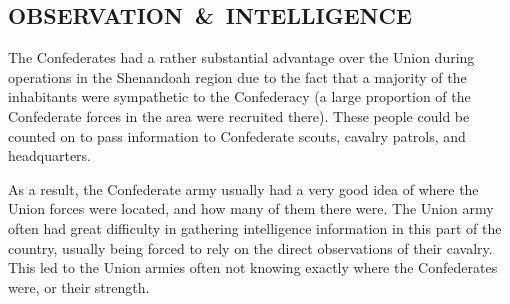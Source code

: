 \subsection[OBSERVATION \& INTELLIGENCE]{\mbox{OBSERVATION \& INTELLIGENCE}}

The Confederates had a rather substantial advantage over the Union during operations in the Shenandoah region due to the fact that a majority of the inhabitants were sympathetic to the Confederacy (a large proportion of the Confederate forces in the area were recruited there). These people could be counted on to pass information to Confederate scouts, cavalry patrols, and headquarters.

As a result, the Confederate army usually had a very good idea of where the Union forces were located, and how many of them there were. The Union army often had great difficulty in gathering intelligence information in this part of the country, usually being forced to rely on the direct observations of their cavalry. This led to the Union armies often not knowing exactly where the Confederates were, or their strength.

